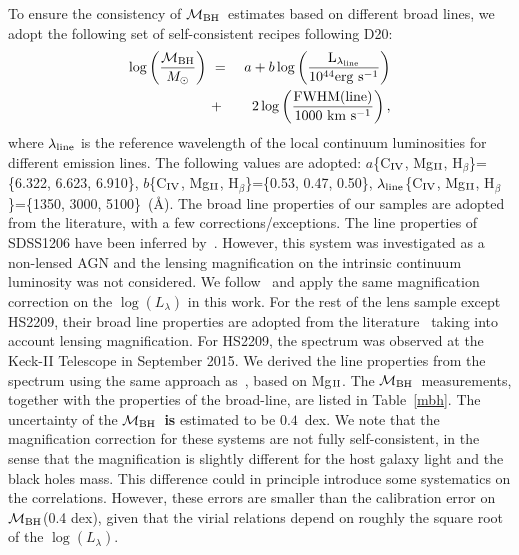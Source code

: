 \documentclass[fleqn,usenatbib]{mnras}
\newcommand{\mbh}{$\mathcal M_{\rm BH}$}
\newcommand{\Hb}{H$_{\beta}$}
\newcommand{\Mgii}{Mg$_{\rm II}$}
\newcommand{\Civ}{C$_{\rm IV}$}
\begin{document}
To ensure the consistency of \mbh\ estimates based on different broad lines, we adopt the following set of self-consistent recipes following D20:
\begin{eqnarray}
\label{recipe}
\log \left(\frac{\mathcal M_{\rm BH}}{M_{\odot}}\right)&~=~& a+b \log \left(\frac{ \rm L _{\lambda_{line}}}{10^{44}{\rm erg~s^{-1}}}\right) \nonumber\\
&~+~& 2 \log \left(\frac{\rm FWHM(line)}{1000 ~{\rm km~s^{-1}}}\right) , 
\end {eqnarray}
where $\lambda_{\rm line}$ is the reference wavelength of the local continuum luminosities for different emission lines. The following values are adopted:
%
$a$\{\Civ, \Mgii, \Hb\}=\{6.322, 6.623, 6.910\},
$b$\{\Civ, \Mgii, \Hb\}=\{0.53, 0.47, 0.50\},
$\lambda_{\rm line}$\{\Civ, \Mgii, \Hb\}=\{1350, 3000, 5100\}~(\AA).
%
The broad line properties of our samples are adopted from the literature, with a few corrections/exceptions. %
The line properties of SDSS1206 have been inferred by~\citet{Shen2011}. However, this system was investigated as a non-lensed AGN and the lensing magnification on the intrinsic continuum luminosity was not considered. We follow~\citet{Birrer2019} and apply the same magnification correction on the $\log(L_\lambda)$ in this work. For the rest of the lens sample except HS2209, their broad line properties are adopted from the literature~\citep{Sluse2012, Peng2006} taking into account lensing magnification. For HS2209, the spectrum was observed at the Keck-II Telescope in September 2015. We derived the line properties from the spectrum using the same approach as~\citet{Sluse2012}, based on \Mgii.
The \mbh\ measurements, together with the properties of the broad-line, are listed in Table~\ref{mbh}. 
The uncertainty of the \mbh\ {\bf is} estimated to be $0.4$~dex.
We note that the magnification correction for these systems are not fully self-consistent, in the sense that the magnification is slightly different for the host galaxy light and the black holes mass. This difference could  in principle introduce some systematics on the correlations. However, these errors are smaller than the calibration error on \mbh (0.4 dex), given that the virial relations depend on roughly the square root of the $\log(L_\lambda)$.
\end{document}
